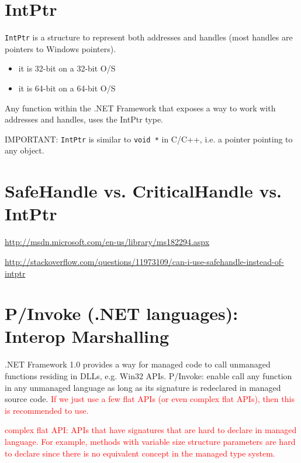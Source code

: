 \section{IntPtr}
\label{sec:IntPtr}

\verb!IntPtr! is a structure to represent both addresses and handles (most
handles are pointers to Windows pointers). 
\begin{itemize}
  \item it is 32-bit on a 32-bit O/S
  \item it is 64-bit on a 64-bit O/S
\end{itemize}
Any function within the .NET Framework that exposes a way to work with addresses
and handles, uses the IntPtr type.

IMPORTANT: \verb!IntPtr! is similar to \verb!void *! in C/C++, i.e. a pointer
pointing to any object.

\section{SafeHandle vs. CriticalHandle vs. IntPtr}
\label{sec:SafeHandle}

\url{http://msdn.microsoft.com/en-us/library/ms182294.aspx}

\url{http://stackoverflow.com/questions/11973109/can-i-use-safehandle-instead-of-intptr}


\section{P/Invoke (.NET languages): Interop Marshalling}
\label{sec:marshalling}
\label{sec:P/Invoke}

.NET Framework 1.0 provides a way for managed code to call unmanaged functions
residing in DLLs, e.g. Win32 APIs.
P/Invoke: enable call any function in any unmanaged language as long as
  its signature is redeclared in managed source code. \textcolor{red}{If we just
  use a few flat APIs (or even complex flat APIs), then this is recommended to
  use.}
  
\begin{mdframed}
\textcolor{red}{complex flat API: APIs that have signatures that are hard to
declare in managed language. For example, methods with variable size structure parameters
are hard to declare since there is no equivalent concept in the managed type
system.}
\end{mdframed}
  

